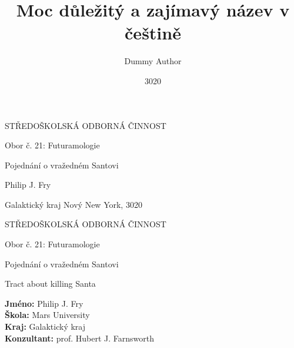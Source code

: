 \documentclass[12pt, a4paper,
 twoside,        %
 openright
]{report}
\title{Moc důležitý a zajímavý název v češtině} %
\author{Dummy Author} %
\date{3020} %
\begin{document}
\pagestyle{empty}

\begin{titlepage}
    \bfseries{ %
        \begin{center}
            \LARGE{STŘEDOŠKOLSKÁ ODBORNÁ ČINNOST}

            \vspace{14pt}
            \large{ %
                Obor č. 21: Futuramologie %
            } %

            \vspace{0.4 \textheight}

            \LARGE{ %
                Pojednání o vražedném Santovi
            }%

            \vspace{0.4\textheight}
        \end{center}
        
        \noindent\Large{Philip J. Fry}  %

        \noindent\Large{Galaktický kraj   Nový New York, 3020} %
        
            
    } %
\end{titlepage}

\cleardoublepage

{\bfseries %
    \begin{center}
        \LARGE{STŘEDOŠKOLSKÁ ODBORNÁ ČINNOST}

        \vspace{14pt}
        {\large %
            Obor č. 21: Futuramologie %
        } %

        \vspace{0.3 \textheight}

        \LARGE{ %
        Pojednání o vražedném Santovi
        }

        \LARGE{ %
        Tract about killing Santa
        }%

        \vspace{0.24\textheight}
    \end{center}  
}%
{\Large %
    \noindent\textbf{Jméno:} Philip J. Fry\\
    \textbf{Škola:} Mars University\\
    \textbf{Kraj:} Galaktický kraj\\
    \textbf{Konzultant:} prof. Hubert J. Farnsworth\\
} %
\end{document}
